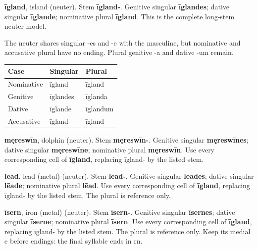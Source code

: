 \textbf{īgland}, island (neuter). Stem \textbf{īgland-}. Genitive singular \textbf{īglandes}; dative singular \textbf{īglande}; nominative plural \textbf{īgland}. This is the complete long-stem neuter model.

The neuter shares singular -es and -e with the masculine, but nominative and accusative plural have no ending. Plural genitive -a and dative -um remain.

\par\begingroup
\fontsize{10.5}{13.2}\selectfont
\setlength{\LTleft}{0pt}\setlength{\LTright}{\fill}
\noindent
\begin{tabular}{@{}>{\raggedright\arraybackslash}p{39.46mm}>{\raggedright\arraybackslash}p{39.46mm}>{\raggedright\arraybackslash}p{39.46mm}@{}}
\toprule
\textbf{Case} & \textbf{Singular} & \textbf{Plural} \\
\midrule
Nominative & īgland & īgland \\
Genitive & īglandes & īglanda \\
Dative & īglande & īglandum \\
Accusative & īgland & īgland \\
\bottomrule
\end{tabular}
\par\endgroup

\textbf{męreswīn}, dolphin (neuter). Stem \textbf{męreswīn-}. Genitive singular \textbf{męreswīnes}; dative singular \textbf{męreswīne}; nominative plural \textbf{męreswīn}. Use every corresponding cell of \textbf{īgland}, replacing īgland- by the listed stem.

\textbf{lēad}, lead (metal) (neuter). Stem \textbf{lēad-}. Genitive singular \textbf{lēades}; dative singular \textbf{lēade}; nominative plural \textbf{lēad}. Use every corresponding cell of \textbf{īgland}, replacing īgland- by the listed stem. The plural is reference only.

\textbf{īsern}, iron (metal) (neuter). Stem \textbf{īsern-}. Genitive singular \textbf{īsernes}; dative singular \textbf{īserne}; nominative plural \textbf{īsern}. Use every corresponding cell of \textbf{īgland}, replacing īgland- by the listed stem. The plural is reference only. Keep its medial e before endings: the final syllable ends in rn.

